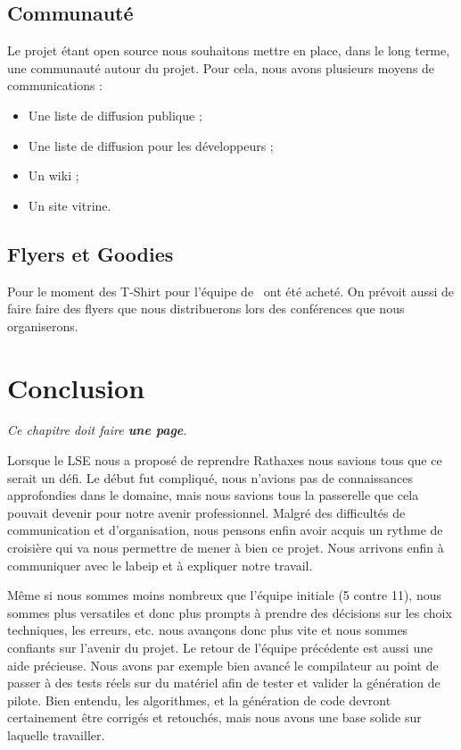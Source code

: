 \documentclass[francais]{rtxreport}
\begin{document}
\section{Communauté}

Le projet étant open source nous souhaitons mettre en place, dans le long terme,
une communauté autour du projet. Pour cela, nous avons plusieurs
moyens de communications :

\begin{itemize}
\item Une liste de diffusion publique ; %
\item Une liste de diffusion pour les développeurs ; %
\item Un wiki ; %
\item Un site vitrine. %
\end{itemize}


\section{Flyers et Goodies}

Pour le moment des T-Shirt pour l'équipe de \rtx\ ont été acheté. On prévoit
aussi de faire faire des flyers que nous distribuerons lors des conférences que
nous organiserons.

\chapter{Conclusion}

\emph{Ce chapitre doit faire \textbf{une page}.}


Lorsque le LSE nous a proposé de reprendre Rathaxes nous savions tous que ce
serait un défi. Le début fut compliqué, nous n’avions pas de connaissances
approfondies dans le domaine, mais nous savions tous la passerelle que cela
pouvait devenir pour notre avenir professionnel. Malgré des difficultés de
communication et d’organisation, nous pensons enfin avoir acquis un rythme de
croisière qui va nous permettre de mener à bien ce projet. Nous arrivons enfin
à communiquer avec le labeip et à expliquer notre travail.

Même si nous sommes moins nombreux que l’équipe initiale (5 contre 11), nous
sommes plus versatiles et donc plus prompts à prendre des décisions sur les
choix techniques, les erreurs, etc. nous avançons donc plus vite et nous sommes
confiants sur l’avenir du projet. Le retour de l'équipe précédente est aussi
une aide précieuse.  Nous avons par exemple bien avancé le compilateur au point
de passer à des tests réels sur du matériel afin de tester et valider la
génération de pilote.  Bien entendu, les algorithmes, et la génération de code
devront certainement être corrigés et retouchés, mais nous avons une base
solide sur laquelle travailler.
\end{document}
